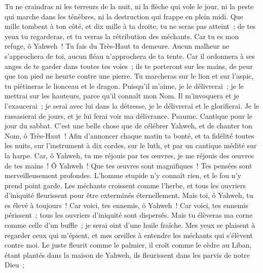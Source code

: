 \begin{multicols}{2}
Tu ne craindras ni les terreurs de la nuit, ni la flèche qui vole le jour,
ni la peste qui marche dans les ténèbres, ni la destruction qui frappe en plein midi.
Que mille tombent à ton côté, et dix mille à ta droite, tu ne seras pas atteint~;
de tes yeux tu regarderas, et tu verras la rétribution des méchants.
Car tu es mon refuge, ô Yahweh~! Tu fais du Très-Haut ta demeure.
Aucun malheur ne s'approchera de toi, aucun fléau n'approchera de ta tente.
Car il ordonnera à ses anges de te garder dans toutes tes voies~;
ils te porteront sur les mains, de peur que ton pied ne heurte contre une pierre.
Tu marcheras sur le lion et sur l'aspic, tu piétineras le lionceau et le dragon.
Puisqu'il m'aime, je le délivrerai~; je le mettrai sur les hauteurs, parce qu'il connaît mon Nom.
Il m'invoquera et je l'exaucerai~; je serai avec lui dans la détresse, je le délivrerai et le glorifierai.
Je le rassasierai de jours, et je lui ferai voir ma délivrance.
\VerseOne{}Psaume. Cantique pour le jour du sabbat.
C'est une belle chose que de célébrer Yahweh, et de chanter ton Nom, ô Très-Haut~!
Afin d'annoncer chaque matin ta bonté, et ta fidélité toutes les nuits,
sur l'instrument à dix cordes, sur le luth, et par un cantique médité sur la harpe.
Car, ô Yahweh, tu me réjouis par tes œuvres, je me réjouis des œuvres de tes mains~!
Ô Yahweh~! Que tes œuvres sont magnifiques~! Tes pensées sont merveilleusement profondes.
L'homme stupide n'y connaît rien, et le fou n'y prend point garde.
Les méchants croissent comme l'herbe, et tous les ouvriers d'iniquité fleurissent pour être exterminés éternellement.
Mais toi, ô Yahweh, tu es élevé à toujours~!
Car voici, tes ennemis, ô Yahweh~! Car voici, tes ennemis périssent~; tous les ouvriers d'iniquité sont dispersés.
Mais tu élèveras ma corne comme celle d'un buffle~; je serai oint d'une huile fraîche.
Mes yeux se plaisent à regarder ceux qui m'épient, et mes oreilles à entendre les méchants qui s'élèvent contre moi.
Le juste fleurit comme le palmier, il croît comme le cèdre au Liban,
étant plantés dans la maison de Yahweh, ils fleurissent dans les parvis de notre Dieu~;

\end{multicols}

